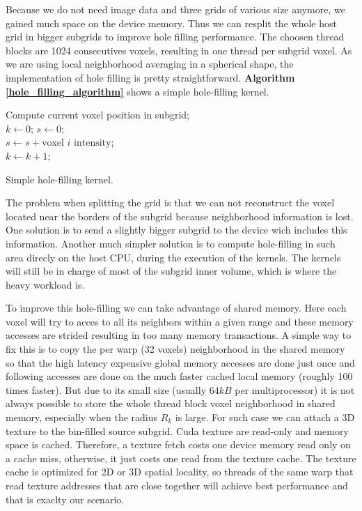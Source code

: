 \documentclass[12pt,journal,compsoc]{IEEEtran}
\begin{document}
Because we do not need image data and three grids of various size anymore, we gained much space on the device memory. Thus we can resplit the whole host grid in bigger subgrids to improve hole filling performance. The choosen thread blocks are 1024 consecutives voxels, resulting in one thread per subgrid voxel.
As we are using local neighborhood averaging in a spherical shape, the implementation of hole filling is pretty straightforward. \textbf{Algorithm \ref{hole_filling_algorithm}} shows a simple hole-filling kernel.

\begin{algorithm}
\vspace{0.2cm}
Compute current voxel position in subgrid;\\
$k\gets0$; $s\gets0$;\\
%
{%
{$s\gets s + \text{voxel }i\text{ intensity}$;\\
$k\gets k + 1$;}}

\caption{Simple hole-filling kernel.}
\label{hole_filling_algorithm}
\end{algorithm}

The problem when splitting the grid is that we can not reconstruct the voxel located near the borders of the subgrid because neighborhood information is lost. One solution is to send a slightly bigger subgrid to the device wich includes this information. Another much simpler solution is to compute hole-filling in such area direcly on the host CPU, during the execution of the kernels. The kernels will still be in charge of most of the subgrid inner volume, which is where the heavy workload is.

To improve this hole-filling we can take advantage of shared memory.
Here each voxel will try to acces to all its neighbors within a given range and these memory accesses are strided resulting in too many memory transactions.
A simple way to fix this is to copy the per warp (32 voxels) neighborhood in the shared memory so that the high latency expensive global memory accesses are done just once and following accesses are done on the much faster cached local memory (roughly 100 times faster).
But due to its small size (usually $64kB$ per multiprocessor) it is not always possible to store the whole thread block voxel neighborhood in shared memory, especially when the radius $R_k$ is large.
For such case we can attach a 3D texture to the bin-filled source subgrid.
Cuda texture are read-only and memory space is cached.
Therefore, a texture fetch costs one device memory read only on a cache miss, otherwise, it just costs one read from the texture cache.
The texture cache is optimized for 2D or 3D spatial locality, so threads of the same warp that read texture addresses that are close together will achieve best performance and that is exaclty our scenario.
\end{document}
